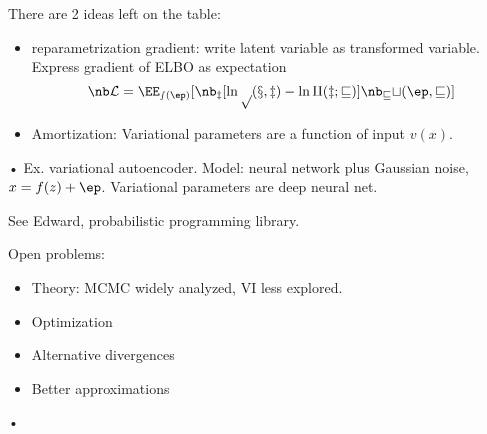 There are 2 ideas left on the table:
\begin{itemize}
\item
reparametrization gradient: write latent variable as transformed variable. 
Express gradient of ELBO as expectation 
$$
\nb \cal L = \EE_{s(\ep)}[\nb_z[\ln p(x,z) - \ln q(z;v)]\nb_vt(\ep,v)]
$$
\item
Amortization: Variational parameters are a function of input $v(x)$.
\end{itemize}•
Ex. variational autoencoder. Model: neural network plus Gaussian noise, $x=f(z)+\ep$. Variational parameters are deep neural net.

See Edward, probabilistic programming library.

Open problems:
\begin{itemize}
\item
Theory: MCMC widely analyzed, VI less explored.
\item
Optimization
\item Alternative divergences
\item
Better approximations
\end{itemize}•